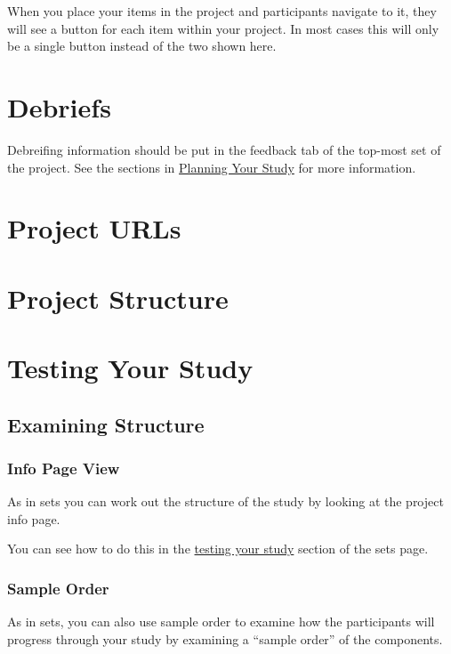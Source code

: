 \documentclass[]{book}
\begin{document}
When you place your items in the project and participants navigate to
it, they will see a button for each item within your project. In most
cases this will only be a single button instead of the two shown here.

\section{Debriefs}\label{debriefs}

Debreifing information should be put in the feedback tab of the top-most
set of the project. See the sections in
\protect\hyperlink{debrief}{Planning Your Study} for more information.

\section{Project URLs}\label{project-urls}

\hypertarget{project_structure}{\section{Project
Structure}\label{project_structure}}

\hypertarget{testingyourstudy}{\section{Testing Your
Study}\label{testingyourstudy}}

\subsection{Examining Structure}\label{examining-structure}

\subsubsection{Info Page View}\label{info-page-view}

As in sets you can work out the structure of the study by looking at the
project info page.

You can see how to do this in the
\protect\hyperlink{info_page_structure}{testing your study} section of
the sets page.

\subsubsection{Sample Order}\label{sample-order}

As in sets, you can also use sample order to examine how the
participants will progress through your study by examining a ``sample
order'' of the components.
\end{document}
